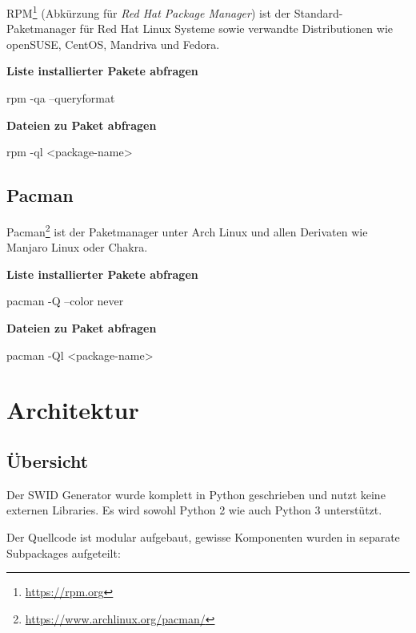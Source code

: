 RPM\footnote{\url{https://rpm.org}} (Abkürzung für \textit{Red Hat Package
Manager}) ist der Standard-Paketmanager für Red Hat Linux Systeme sowie
verwandte Distributionen wie openSUSE, CentOS, Mandriva und Fedora.

\textbf{Liste installierter Pakete abfragen}

\begin{bashcode}
rpm -qa --queryformat %
\end{bashcode}

\textbf{Dateien zu Paket abfragen}

\begin{bashcode}
rpm -ql <package-name>
\end{bashcode}


\subsection{Pacman}

Pacman\footnote{\url{https://www.archlinux.org/pacman/}} ist der Paketmanager
unter Arch Linux und allen Derivaten wie Manjaro Linux oder Chakra.

\textbf{Liste installierter Pakete abfragen}

\begin{bashcode}
pacman -Q --color never
\end{bashcode}

\textbf{Dateien zu Paket abfragen}

\begin{bashcode}
pacman -Ql <package-name>
\end{bashcode}



\section{Architektur}

\subsection{Übersicht}

Der SWID Generator wurde komplett in Python geschrieben und nutzt keine externen
Libraries. Es wird sowohl Python 2 wie auch Python 3 unterstützt.

Der Quellcode ist modular aufgebaut, gewisse Komponenten wurden in separate
Subpackages aufgeteilt:

